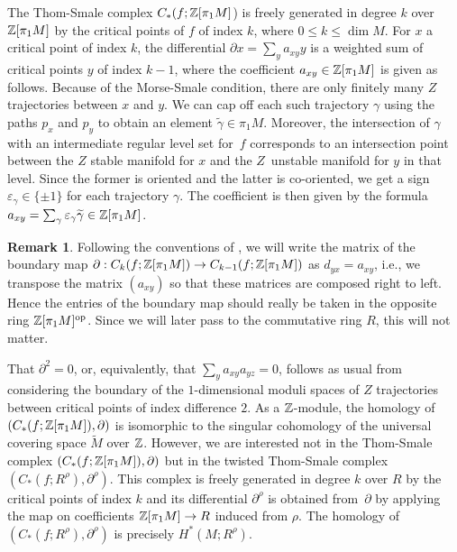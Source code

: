 \documentclass[11pt]{article}
\newcommand{\ie}{i.e.,\xspace}
\numberwithin{equation}{section}\providecommand{\dpl}{\displaystyle}
\newcommand{\op}{\mathrm{op}}
\theoremstyle{plain}
\theoremstyle{definition}
\newtheorem{remark}[theorem]{Remark}
\let\ve\varepsilon
\begin{document}
The Thom-Smale complex $C_*(f ; \mathbb{Z}[\pi_1M]$) is freely generated in degree $k$ over $\mathbb{Z}[\pi_1M]$ by the critical points of $f$ of index $k$, where $0 \leq k \leq \dim M$. For $x$ a critical point of index $k$, the differential $\partial x = \sum_y a_{xy} y$ is a weighted sum of critical points $y$ of index $k-1$, where the coefficient $a_{xy} \in \mathbb{Z}[\pi_1M]$ is given as follows. Because of the Morse-Smale condition, there are only finitely many $Z$ trajectories between $x$ and $y$. We can cap off each such trajectory $\gamma$ using the paths $p_x$ and $p_y$ to obtain an element $\widetilde \gamma \in \pi_1M$. Moreover, the intersection of $\gamma$ with an intermediate regular level set for~$f$ corresponds to an intersection point between the $Z$ stable manifold for $x$ and the $Z$~unstable manifold for $y$ in that level. Since the former is oriented and the latter is co-oriented, we get a sign $\ve_\gamma \in \{\pm 1\}$ for each trajectory $\gamma$. The coefficient is then given by the formula $a_{xy} = \sum_\gamma \ve_\gamma \widetilde \gamma \in \bZ[\pi_1M]$.

\begin{remark}\label{second remark about IK conventions}
Following the conventions of \cite{IK93}, we will write the matrix of the boundary map $\partial :C_k(f ; \mathbb{Z}[\pi_1M]) \to C_{k-1}(f ; \mathbb{Z}[\pi_1 M])$ as $d_{yx}=a_{xy}$, \ie we transpose the matrix $(a_{xy})$ so that these matrices are composed right to left. Hence the entries of the boundary map should really be taken in the opposite ring $\bZ[\pi_1M]^{\op}$. Since we will later pass to the commutative ring $R$, this will not matter.
\end{remark}

That $\partial^2=0$, or, equivalently, that $\sum_y a_{xy} a_{yz}=0$, follows as usual from considering the boundary of the $1$-dimensional moduli spaces of $Z$ trajectories between critical points of index difference $2$. As a $\mathbb{Z}$-module, the homology of $(C_*(f ; \mathbb{Z}[\pi_1M]), \partial)$ is isomorphic to the singular cohomology of the universal covering space $\widetilde M$ over $\mathbb{Z}$. However, we are interested not in the Thom-Smale complex $(C_*(f ; \mathbb{Z}[\pi_1M]), \partial)$ but in the twisted Thom-Smale complex $(C_*(f ; R^\rho), \partial^\rho)$. This complex is freely generated in degree $k$ over $R$ by the critical points of index $k$ and its differential $\partial^\rho$ is obtained from~$\partial$ by applying the map on coefficients $\mathbb{Z}[\pi_1M] \to R$ induced from $\rho$. The homology of $(C_*(f; R^\rho),\partial^\rho)$ is precisely $H^*(M;R^\rho)$.
\end{document}
